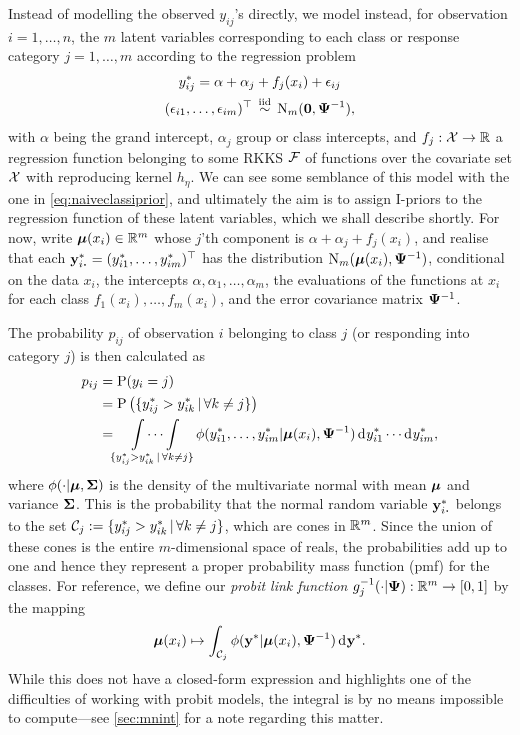 Instead of modelling the observed $y_{ij}$'s directly, we model instead, for observation $i=1,\dots,n$, the $m$ latent variables corresponding to each class or response category $j=1,\dots,m$ according to the regression problem
\begin{equation}\label{eq:multinomial-latent}
  \begin{gathered}
    y_{ij}^* = \alpha + \alpha_j + f_j(x_i) + \epsilon_{ij} \\
    (\epsilon_{i1}, \dots, \epsilon_{im})^\top  \,\overset{\text{iid}}{\sim}\, \operatorname{N}_m({\mathbf 0}, {\bm\Psi}^{-1}), 
  \end{gathered}
\end{equation}
with $\alpha$ being the grand intercept, $\alpha_j$ group or class intercepts, and $f_j:{\mathcal X} \to \mathbb{R}$ a regression function belonging to some RKKS ${\mathcal F}$ of functions over the covariate set ${\mathcal X}$ with reproducing kernel $h_\eta$.
We can see some semblance of this model with the one in \cref{eq:naiveclassiprior}, and ultimately the aim is to assign I-priors to the regression function of these latent variables, which we shall describe shortly.
For now, write ${\bm\mu}(x_i) \in \mathbb{R}^m$ whose $j$'th component is $\alpha + \alpha_j + f_j(x_i)$, and realise that each $\by_{i \bigcdot}^* = (y_{i1}^*, \dots, y_{im}^*)^\top$ has the distribution $\operatorname{N}_m({\bm\mu}(x_i), {\bm\Psi}^{-1})$, conditional on the data $x_i$,  the intercepts $\alpha,\alpha_1,\dots,\alpha_m$, the evaluations of the functions at $x_i$ for each class $f_1(x_i), \dots, f_m(x_i)$, and the error covariance matrix ${\bm\Psi}^{-1}$.

\newcommand{\intset}{\{y_{ij}^* > y_{ik}^* \,|\, \forall k \neq j\}}
The probability $p_{ij}$ of observation $i$ belonging to class $j$ (or responding into category $j$) is then calculated as 
\begin{align}
  p_{ij} 
  &= \Prob(y_i = j) \nonumber \\
  &= \Prob\big(\intset\big) \nonumber \\
  &= \idotsint\displaylimits_{\intset} \phi(y_{i1}^*, \dots, y_{im}^*|\bmu(x_i), \bPsi^{-1}) \dint y_{i1}^* \cdots \dint y_{im}^*,\label{eq:pij}
\end{align}
where $\phi(\cdot|{\bm\mu},{\bm\Sigma})$ is the density of the multivariate normal with mean ${\bm\mu}$ and variance ${\bm\Sigma}$.
This is the probability that the normal random variable $\by_{i \bigcdot}^*$ belongs to the set $\cC_j := \intset$, which are cones in $\mathbb{R}^m$.
Since the union of these cones is the entire $m$-dimensional space of reals, the probabilities add up to one and hence they represent a proper probability mass function (pmf) for the classes.
For reference, we define our \emph{probit link function} $  g_j^{-1}(\cdot|{\bm\Psi}): \mathbb{R}^{m} \to [0,1]$ by the mapping
\begin{equation}\label{eq:probitlink}
  {\bm\mu}(x_i) \mapsto \int_{{\mathcal C}_j} \phi({\mathbf y}^*|{\bm\mu}(x_i),{\bm\Psi}^{-1}) \operatorname{d}\hspace{0.5pt}\! {\mathbf y}^*.
\end{equation}
While this does not have a closed-form expression and highlights one of the difficulties of working with probit models, the integral is by no means impossible to compute---see \cref{sec:mnint} for a note regarding this matter.

